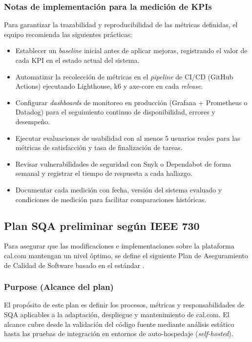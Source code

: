 \documentclass[12pt, a4paper]{article}
\begin{document}
\subsubsection*{Notas de implementación para la medición de KPIs}

Para garantizar la trazabilidad y reproducibilidad de las métricas definidas, el equipo
recomienda las siguientes prácticas:

\begin{itemize}
    \item Establecer un \textit{baseline} inicial antes de aplicar mejoras, registrando el valor de cada KPI en el estado actual del sistema.
    \item Automatizar la recolección de métricas en el \textit{pipeline} de CI/CD (GitHub Actions) ejecutando Lighthouse, k6 y axe-core en cada \textit{release}.
    \item Configurar \textit{dashboards} de monitoreo en producción (Grafana + Prometheus o Datadog) para el seguimiento continuo de disponibilidad, errores y desempeño.
    \item Ejecutar evaluaciones de usabilidad con al menos 5 usuarios reales para las métricas de satisfacción y tasa de finalización de tareas.
    \item Revisar vulnerabilidades de seguridad con Snyk o Dependabot de forma semanal y registrar el tiempo de respuesta a cada hallazgo.
    \item Documentar cada medición con fecha, versión del sistema evaluado y condiciones de medición para facilitar comparaciones históricas.
\end{itemize}

\subsection{Plan SQA preliminar según IEEE 730}

Para asegurar que las modificaciones e implementaciones sobre la plataforma cal.com mantengan un nivel óptimo, se define el siguiente Plan de Aseguramiento de Calidad de Software basado en el estándar \parencite{ieee730}.

\subsubsection*{Purpose (Alcance del plan)}
El propósito de este plan es definir los procesos, métricas y responsabilidades de SQA aplicables a la adaptación, despliegue y mantenimiento de cal.com. El alcance cubre desde la validación del código fuente mediante análisis estático hasta las pruebas de integración en entornos de auto-hospedaje (\textit{self-hosted}).
\end{document}
